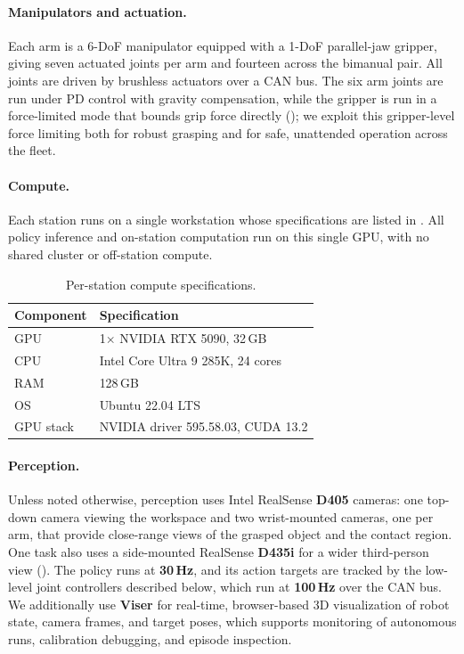 \paragraph{Manipulators and actuation.}
Each arm is a 6-DoF manipulator equipped with a 1-DoF parallel-jaw gripper, giving seven actuated joints per arm and fourteen across the bimanual pair. All joints are driven by brushless actuators over a CAN bus. The six arm joints are run under PD control with gravity compensation, while the gripper is run in a force-limited mode that bounds grip force directly (); we exploit this gripper-level force limiting both for robust grasping and for safe, unattended operation across the fleet.

\paragraph{Compute.}
Each station runs on a single workstation whose specifications are listed in . All policy inference and on-station computation run on this single GPU, with no shared cluster or off-station compute.

\begin{table}[h]
\centering
\caption{Per-station compute specifications.}
\label{tab:compute}
\begin{tabular}{ll}
\toprule
Component & Specification \\
\midrule
GPU       & 1$\times$ NVIDIA RTX 5090, 32\,GB \\
CPU       & Intel Core Ultra 9 285K, 24 cores \\
RAM       & 128\,GB \\
OS        & Ubuntu 22.04 LTS \\
GPU stack & NVIDIA driver 595.58.03, CUDA 13.2 \\
\bottomrule
\end{tabular}
\end{table}

\paragraph{Perception.}
Unless noted otherwise, perception uses Intel RealSense \textbf{D405} cameras: one top-down camera viewing the workspace and two wrist-mounted cameras, one per arm, that provide close-range views of the grasped object and the contact region. One task also uses a side-mounted RealSense \textbf{D435i} for a wider third-person view (). The policy runs at \textbf{30\,Hz}, and its action targets are tracked by the low-level joint controllers described below, which run at \textbf{100\,Hz} over the CAN bus. We additionally use \textbf{Viser} for real-time, browser-based 3D visualization of robot state, camera frames, and target poses, which supports monitoring of autonomous runs, calibration debugging, and episode inspection.

